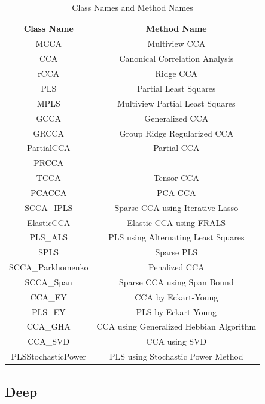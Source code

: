 \begin{table}[ht]
    \centering
    \begin{tabular}{|c|c|}
        \hline
        Class Name & Method Name \\
        \hline
        MCCA & Multiview CCA \\
        CCA & Canonical Correlation Analysis \\
        rCCA & Ridge CCA \\
        PLS & Partial Least Squares \\
        MPLS & Multiview Partial Least Squares \\
        GCCA & Generalized CCA \\
        GRCCA & Group Ridge Regularized CCA \\
        PartialCCA & Partial CCA \\
        PRCCA &  \\
        TCCA & Tensor CCA \\
        PCACCA & PCA CCA \\
        SCCA\_IPLS & Sparse CCA using Iterative Lasso \\
        ElasticCCA & Elastic CCA using FRALS \\
        PLS\_ALS & PLS using Alternating Least Squares \\
        SPLS & Sparse PLS \\
        SCCA\_Parkhomenko & Penalized CCA \\
        SCCA\_Span & Sparse CCA using Span Bound \\
        CCA\_EY & CCA by Eckart-Young \\
        PLS\_EY & PLS by Eckart-Young \\
        CCA\_GHA & CCA using Generalized Hebbian Algorithm \\
        CCA\_SVD & CCA using SVD \\
        PLSStochasticPower & PLS using Stochastic Power Method \\
        \hline
    \end{tabular}
    \caption{Class Names and Method Names}
    \label{tab:class_method}
\end{table}


\subsection{Deep}

